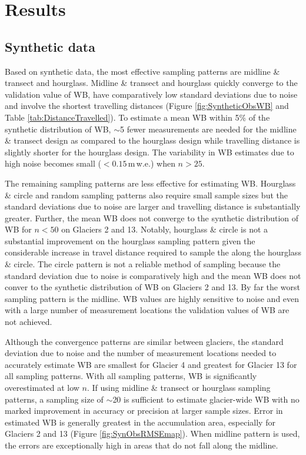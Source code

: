 \documentclass[twocolumn,letterpaper]{igs}
\begin{document}
\section{Results }

\subsection{Synthetic data}

Based on synthetic data, the most effective sampling patterns are midline \& transect and hourglass. Midline \& transect and hourglass quickly converge to the validation value of WB, have comparatively low standard deviations due to noise and involve the shortest travelling distances (Figure \ref{fig:SyntheticObsWB} and Table \ref{tab:DistanceTravelled}). To estimate a mean WB within 5\% of the synthetic distribution of WB, $\sim$5 fewer measurements are needed for the midline \& transect design as compared to the hourglass design while travelling distance is slightly shorter for the hourglass design. The variability in WB estimates due to high noise becomes small ($<0.15$\,m\,w.e.) when $n>25$.

The remaining sampling patterns are less effective for estimating WB. Hourglass \& circle and random sampling patterns also require small sample sizes but the standard deviations due to noise are larger and travelling distance is substantially greater. Further, the mean WB does not converge to the synthetic distribution of WB for $n<50$ on Glaciers 2 and 13. Notably, hourglass \& circle is not a substantial improvement on the hourglass sampling pattern given the considerable increase in travel distance required to sample the along the hourglass \& circle. The circle pattern is not a reliable method of sampling because the standard deviation due to noise is comparatively high and the mean WB does not conver to the synthetic distribution of WB on Glaciers 2 and 13. By far the worst sampling pattern is the midline. WB values are highly sensitive to noise and even with a large number of measurement locations the validation values of WB are not achieved. 

Although the convergence patterns are similar between glaciers, the standard deviation due to noise and the number of measurement locations needed to accurately estimate WB are smallest for Glacier 4 and greatest for Glacier 13 for all sampling patterns. With all sampling patterns, WB is significantly overestimated at low $n$. If using midline \& transect or hourglass sampling patterns, a sampling size of $\sim$20 is sufficient to estimate glacier-wide WB with no marked improvement in accuracy or precision at larger sample sizes. 
Error in estimated WB is generally greatest in the accumulation area, especially for Glaciers 2 and 13 (Figure \ref{fig:SynObsRMSEmap}). When midline pattern is used, the errors are exceptionally high in areas that do not fall along the midline.
\end{document}
